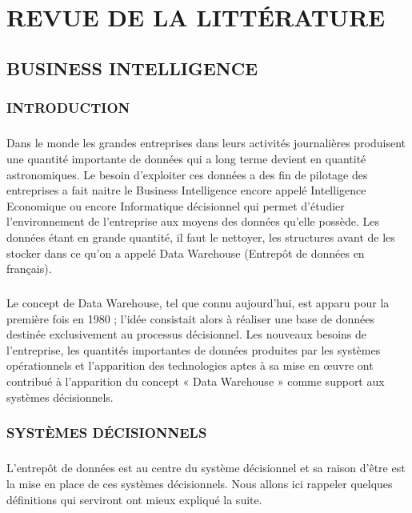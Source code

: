 \chapter{REVUE DE LA LITTÉRATURE}

\section{BUSINESS INTELLIGENCE}
	\subsection{INTRODUCTION}
  		\paragraph{}
  		Dans le monde les grandes entreprises dans leurs activités journalières produisent une quantité importante de données qui a long terme devient en quantité astronomiques. Le besoin d’exploiter ces données a des fin de pilotage des entreprises a fait naitre le Business Intelligence encore appelé Intelligence Economique ou encore Informatique décisionnel qui permet d’étudier l’environnement de l’entreprise aux moyens des données qu’elle possède. Les données étant en grande quantité, il faut le nettoyer, les structures avant de les stocker dans ce qu’on a appelé Data Warehouse (Entrepôt de données en français).
  
  		\paragraph{}
  Le concept de Data Warehouse, tel que connu aujourd’hui, est apparu pour la première  fois en 1980 ; l’idée consistait alors à réaliser une base de données destinée exclusivement au processus décisionnel. Les nouveaux besoins de l’entreprise, les quantités importantes de données produites par les systèmes opérationnels et l’apparition des technologies aptes à sa mise en œuvre ont contribué à l’apparition du concept « Data Warehouse » comme support aux systèmes décisionnels.
  
  
	\subsection{SYSTÈMES DÉCISIONNELS}
  		\paragraph{}
  L’entrepôt de données est au centre du système décisionnel et sa raison d’être est la mise en place de ces systèmes décisionnels. Nous allons ici rappeler quelques définitions qui serviront ont mieux expliqué la suite.

